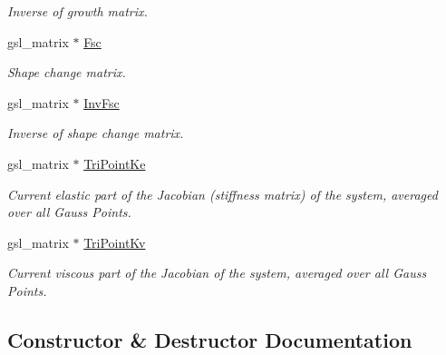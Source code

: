 \begin{DoxyCompactItemize}
\begin{DoxyCompactList}\small\item\em Inverse of growth matrix. \end{DoxyCompactList}\item 
\hypertarget{classShapeBase_a08d7f6e8f098a7b5985c615842062014}{}gsl\+\_\+matrix $\ast$ \hyperlink{classShapeBase_a08d7f6e8f098a7b5985c615842062014}{Fsc}\label{classShapeBase_a08d7f6e8f098a7b5985c615842062014}

\begin{DoxyCompactList}\small\item\em Shape change matrix. \end{DoxyCompactList}\item 
\hypertarget{classShapeBase_ad72828aab0668c993f57727123aa96be}{}gsl\+\_\+matrix $\ast$ \hyperlink{classShapeBase_ad72828aab0668c993f57727123aa96be}{Inv\+Fsc}\label{classShapeBase_ad72828aab0668c993f57727123aa96be}

\begin{DoxyCompactList}\small\item\em Inverse of shape change matrix. \end{DoxyCompactList}\item 
\hypertarget{classShapeBase_ace20710f27099833509c474b221c25df}{}gsl\+\_\+matrix $\ast$ \hyperlink{classShapeBase_ace20710f27099833509c474b221c25df}{Tri\+Point\+Ke}\label{classShapeBase_ace20710f27099833509c474b221c25df}

\begin{DoxyCompactList}\small\item\em Current elastic part of the Jacobian (stiffness matrix) of the system, averaged over all Gauss Points. \end{DoxyCompactList}\item 
\hypertarget{classShapeBase_a7fa5b1338e405a2c75c8d010f4153b05}{}gsl\+\_\+matrix $\ast$ \hyperlink{classShapeBase_a7fa5b1338e405a2c75c8d010f4153b05}{Tri\+Point\+Kv}\label{classShapeBase_a7fa5b1338e405a2c75c8d010f4153b05}

\begin{DoxyCompactList}\small\item\em Current viscous part of the Jacobian of the system, averaged over all Gauss Points. \end{DoxyCompactList}\end{DoxyCompactItemize}


\subsection{Constructor \& Destructor Documentation}
\hypertarget{classShapeBase_af919db3ff5e6a6d4a137cf4625189c23}{}
